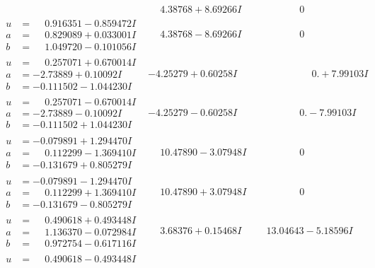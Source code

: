 \documentclass[1p]{elsarticle_modified}
\theoremstyle{definition}
\begin{document}
$$\begin{array}{c|c|c}
 & \phantom{-}4.38768 + 8.69266 I & \phantom{-0.000000 } 0 \\ \hline\begin{aligned}
u &= \phantom{-}0.916351 - 0.859472 I \\
a &= \phantom{-}0.829089 + 0.033001 I \\
b &= \phantom{-}1.049720 - 0.101056 I\end{aligned}
 & \phantom{-}4.38768 - 8.69266 I & \phantom{-0.000000 } 0 \\ \hline\begin{aligned}
u &= \phantom{-}0.257071 + 0.670014 I \\
a &= -2.73889 + 0.10092 I \\
b &= -0.111502 - 1.044230 I\end{aligned}
 & -4.25279 + 0.60258 I & \phantom{-0.000000 -}0. + 7.99103 I \\ \hline\begin{aligned}
u &= \phantom{-}0.257071 - 0.670014 I \\
a &= -2.73889 - 0.10092 I \\
b &= -0.111502 + 1.044230 I\end{aligned}
 & -4.25279 - 0.60258 I & \phantom{-0.000000 } 0. - 7.99103 I \\ \hline\begin{aligned}
u &= -0.079891 + 1.294470 I \\
a &= \phantom{-}0.112299 - 1.369410 I \\
b &= -0.131679 + 0.805279 I\end{aligned}
 & \phantom{-}10.47890 - 3.07948 I & \phantom{-0.000000 } 0 \\ \hline\begin{aligned}
u &= -0.079891 - 1.294470 I \\
a &= \phantom{-}0.112299 + 1.369410 I \\
b &= -0.131679 - 0.805279 I\end{aligned}
 & \phantom{-}10.47890 + 3.07948 I & \phantom{-0.000000 } 0 \\ \hline\begin{aligned}
u &= \phantom{-}0.490618 + 0.493448 I \\
a &= \phantom{-}1.136370 - 0.072984 I \\
b &= \phantom{-}0.972754 - 0.617116 I\end{aligned}
 & \phantom{-}3.68376 + 0.15468 I & \phantom{-}13.04643 - 5.18596 I \\ \hline\begin{aligned}
u &= \phantom{-}0.490618 - 0.493448 I \\

\end{aligned}
\end{array}$$
\end{document}
